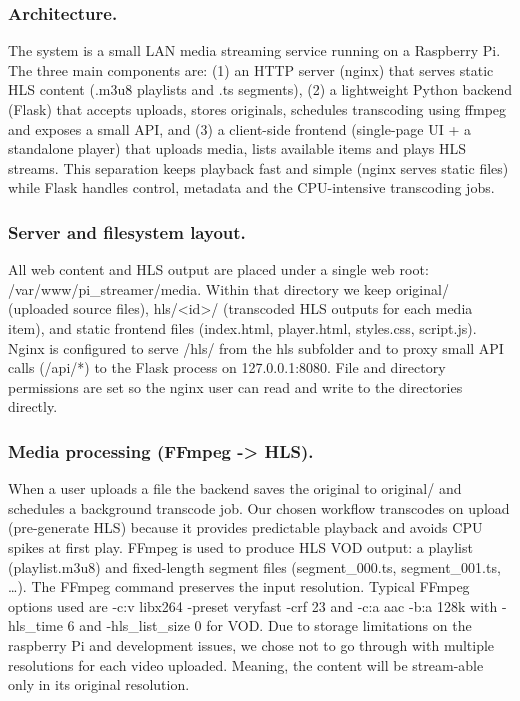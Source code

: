 \documentclass[11pt]{article}
\begin{document}
\subsubsection{Architecture.}
The system is a small LAN media streaming service running on a Raspberry Pi. The three main components are: (1) an HTTP server (nginx) that serves static HLS content (.m3u8 playlists and .ts segments), (2) a lightweight Python backend (Flask)\cite{flask_quickstart} that accepts uploads, stores originals, schedules transcoding using ffmpeg and exposes a small API, and (3) a client-side frontend (single-page UI + a standalone player) that uploads media, lists available items and plays HLS streams. This separation keeps playback fast and simple (nginx serves static files) while Flask handles control, metadata and the CPU-intensive transcoding jobs.

\subsubsection{Server and filesystem layout.}
All web content and HLS output are placed under a single web root: \\/var/www/pi\_streamer/media. Within that directory we keep original/ (uploaded source files), hls/<id>/ (transcoded HLS outputs for each media item), and static frontend files (index.html, player.html, styles.css, script.js). Nginx is configured to serve /hls/ from the hls subfolder and to proxy small API calls (/api/*) to the Flask process on 127.0.0.1:8080. File and directory permissions are set so the nginx user can read and write to the directories directly.

\subsubsection{Media processing (FFmpeg -> HLS).}
When a user uploads a file the backend saves the original to original/ and schedules a background transcode job. Our chosen workflow transcodes on upload (pre-generate HLS) because it provides predictable playback and avoids CPU spikes at first play. FFmpeg is used to produce HLS VOD output: a playlist (playlist.m3u8) and fixed-length segment files (segment\_000.ts, segment\_001.ts, …)\cite{ffmpeg_hls}. The FFmpeg command preserves the input resolution. Typical FFmpeg options used are -c:v libx264 -preset veryfast -crf 23 and -c:a aac -b:a 128k with -hls\_time 6 and -hls\_list\_size 0 for VOD. Due to storage limitations on the raspberry Pi and development issues, we chose not to go through with multiple resolutions for each video uploaded. Meaning, the content will be stream-able only in its original resolution.
\end{document}
